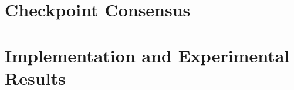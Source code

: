 \documentclass[a4paper,10pt,twoside]{report}
\begin{document}
\clearemptydoublepage

\chapter{Checkpoint Consensus}\label{ch:consensus}


\clearemptydoublepage

\chapter{Implementation and Experimental Results}\label{ch:implementation}


\clearemptydoublepage

%



%
%
%
\end{document}
